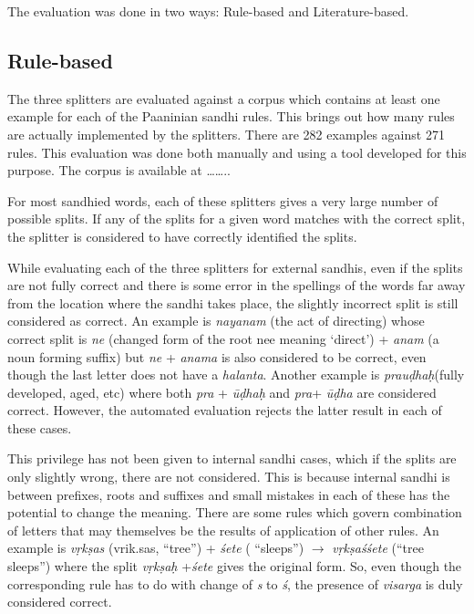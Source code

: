 \documentclass[11pt]{article}
\begin{document}
The evaluation was done in two ways: Rule-based and Literature-based. 


\subsection{Rule-based}
The three splitters are evaluated against a corpus which contains at least one example for each of the Paaninian sandhi rules. This brings out how many rules are actually implemented by the splitters. There are 282 examples against 271 rules. This evaluation was done both manually and using a tool developed for this purpose. The corpus is available at ……..

For most sandhied words, each of these splitters gives a very large number of possible splits. If any of the splits for a given word matches with the correct split, the splitter is considered to have correctly identified the splits. 

While evaluating each of the three splitters for external sandhis, even if the splits are not fully correct and there is some error in the spellings of the words far away from the location where the sandhi takes place, the slightly incorrect split is still considered as correct. An example is \textit{nayanam} (the act of directing)  whose correct split is \textit{ne} (changed form of the root nee meaning ‘direct’) + \textit{anam} (a noun forming suffix)  but \textit{ne}  + \textit{anama} is also considered to be correct, even though the last letter does not have a \textit{halanta}.  Another example is \textit{prau\d{d}ha\d{h}}(fully developed, aged, etc) where both \textit{pra} + \textit{\={u}\d{d}ha\d{h}}  and \textit{pra}+ \textit{\={u}\d{d}ha} are considered correct.  However, the automated evaluation rejects the latter result in each of these cases.


This privilege has not been given to internal sandhi cases, which if the splits are only slightly wrong, there are not considered.  This is because internal sandhi is between prefixes, roots and suffixes and small mistakes in each of these has the potential to change the meaning.
There are some rules which govern combination of letters that may themselves be the results of application of other rules. An example is \textit{v\d{r}k\d{s}as }(vrik.sas, “tree”) + \textit{\'{s}ete} ( ``sleeps'') $\rightarrow$ \textit{v\d{r}k\d{s}a\'{s}\'{s}ete} (``tree sleeps'') where the split \textit{v\d{r}k\d{s}a\d{h} } +\textit{\'{s}ete}  gives the original form. So, even though the corresponding rule has to do with change of \textit{s} to\textit{ \'{s}}, the presence of \textit{visarga} is duly considered correct.
\end{document}
